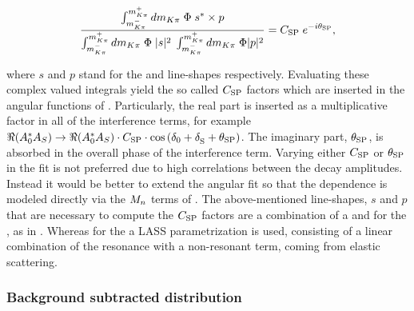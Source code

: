 \begin{equation}
  \centering
  \label{csp_def}
  \frac{\int_{\mkpi^-}^{\mkpi^+} d\mkpi \; \Phi \; s^* \times p} {\int_{\mkpi^-}^{\mkpi^+} d\mkpi \; \Phi \; |s|^2 \; \int_{\mkpi^-}^{\mkpi^+} d\mkpi \; \Phi |p|^2} = \CSP \; e^{-i\ThetaSP},
\end{equation}

\noindent where $s$ and $p$ stand for the \swave and \pwave line-shapes respectively. Evaluating these complex valued integrals yield
the so called $C_{\text{SP}}$ factors which are inserted in the angular functions of . Particularly, the real part
is inserted as a multiplicative factor in all of the \spwave interference terms, for example $\Re({A}_{0}^* {A}_{S}) \rightarrow \Re({A}_{0}^* {A}_{S}) \cdot C_{\text{SP}}\cdot\cos\left( \delta_{0}+\delta_{\text{S}}^{}+\theta_{\text{SP}} \right)$.
The imaginary part, $\theta_{\text{SP}}$, is absorbed in the overall phase of the \spwave interference term.
Varying either $C_{\text{SP}}$ or $\theta_{\text{SP}}$ in the fit is not preferred due to high correlations between the decay amplitudes.
Instead it would be better to extend the angular fit so that the \mkpi dependence is modeled directly via the $M_{n}$
terms of . The above-mentioned line-shapes, $s$ and $p$ that are necessary
to compute the $C_{\text{SP}}$ factors are a combination of a \KstENT and \KstOFOZ for the \pwave, as in \cite{PhysRevD.11.3165}.
Whereas for the \swave a LASS parametrization \cite{Aston1988493} is used, consisting of a linear combination of the \KstOFTZ resonance with
a non-resonant term, coming from elastic scattering.

\subsubsection{Background subtracted \mkpi distribution}

